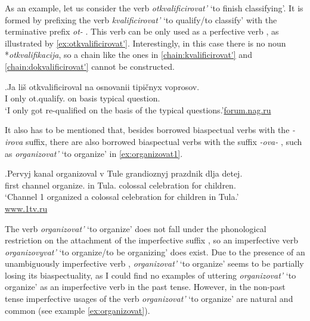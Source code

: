 As an example, let us consider the verb \textit{otkvalificirovat'} `to finish classifying'. It is formed by prefixing the verb \textit{kvalificirovat'} `to qualify/to classify' with the terminative  prefix \textit{ot-}  . This verb can be only used as a perfective verb , as illustrated by \ref{ex:otkvalificirovat'}. Interestingly, in this case there is no noun *\textit{otkvalifikacija}, so a chain like the ones in \ref{chain:kvalificirovat'} and \ref{chain:dokvalificirovat'} cannot be constructed. 

\exg.\label{ex:otkvalificirovat'}Ja li\v{s} otkvalificiroval na osnovanii tipi\v{c}nyx voprosov.\\
I only ot.qualify. on basis typical question.\\
\trans `I only got re-qualified on the basis of the typical questions.'\hbox{}\hfill\hbox{\url{forum.nag.ru}}

It also has to be mentioned that, besides borrowed biaspectual verbs    with the \mbox{\textit{-irova}} suffix, there are also borrowed biaspectual verbs    with the suffix \textit{-ova-}  , such as \textit{organizovat'} `to organize' in \ref{ex:organizovat1}. 

\exg.\label{ex:organizovat1}Pervyj kanal organizoval\textsuperscript{\PF} v Tule grandioznyj prazdnik dlja detej.\\
first channel organize. in Tula. colossal celebration for children.\\
\trans `Channel 1 organized a colossal celebration for children in Tula.'\\\hbox{}\hfill\hbox{\url{www.1tv.ru}}

The verb \textit{organizovat'} `to organize' does not fall under the phonological restriction on the attachment of the imperfective suffix  , so an imperfective verb  \textit{organizovyvat'}\textsuperscript{\IPF} `to organize/to be organizing' does exist. Due to the presence of an unambiguously imperfective verb , \textit{organizovat'} `to organize' seems to be partially losing its biaspectuality, as I could find no examples of uttering \textit{organizovat'} `to organize' as an imperfective verb  in the past  tense. However, in the non-past   tense imperfective usages of the verb \textit{organizovat'} `to organize' are natural and common (see example \ref{ex:organizovat}).


